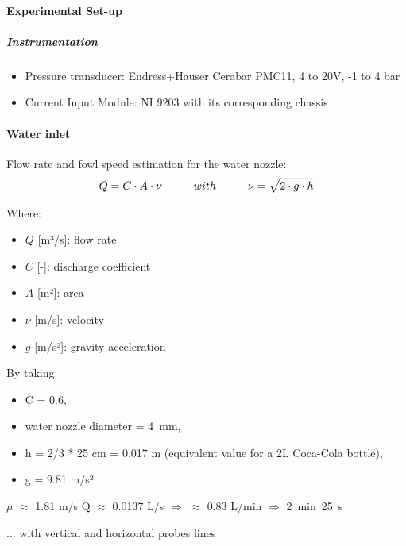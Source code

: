 \documentclass[../../main.tex]{subfiles}
\begin{document}
\paragraph{Experimental Set-up}

\subparagraph{Instrumentation}

\begin{itemize}
    \item Pressure transducer: Endress+Hauser Cerabar PMC11, 4 to 20V, -1 to 4 bar
    \item Current Input Module: NI 9203 with its corresponding chassis
\end{itemize}

\paragraph{Water inlet}

Flow rate and fowl speed estimation for the water nozzle:\\

\vspace{0mm}
\begin{equation}
\begin{aligned}
Q = C \cdot A \cdot \nu
\hspace{10mm}
with
\hspace{10mm}
\nu = \sqrt{2 \cdot g \cdot h}
\label{Flow_rate}
\end{aligned}
\end{equation}
\vspace{0mm}

\vspace{0mm}
\begin{minipage}{\linewidth}
Where:
\begin{itemize}
   \item $Q$ [m³/s]: flow rate
   \item $C$ [-]: discharge coefficient
   \item $A$ [m²]: area
   \item $\nu$ [m/s]: velocity
   \item $g$ [m/s²]: gravity acceleration
\end{itemize}
\end{minipage}
\vspace{0mm}

By taking:
\begin{itemize}
    \item C = 0.6,
    \item water nozzle diameter = 4~mm,
    \item h = 2/3 * 25 cm = 0.017 m (equivalent value for a 2L Coca-Cola bottle),
    \item g = 9.81 m/s²
\end{itemize}

$\mu$ $\approx$ 1.81 m/s
Q $\approx$ 0.0137 L/s $\Rightarrow$ $\approx$ 0.83 L/min $\Rightarrow$ 2~min~25~s

... with vertical and horizontal probes lines\\
\end{document}
